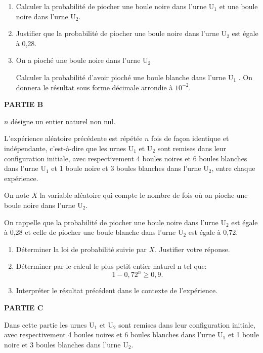 \documentclass[10pt]{article}
\begin{document}
\begin{enumerate}[start=2]
\item Calculer la probabilité de piocher une boule noire dans l'urne U$_1$ et une boule noire dans l'urne U$_2$.
\item Justifier que la probabilité de piocher une boule noire dans l'urne U$_2$ est égale à 0,28.
\item On a pioché une boule noire dans l'urne U$_2$

Calculer la probabilité d'avoir pioché une boule
blanche dans l'urne U$_1$ . On donnera le résultat sous forme décimale arrondie à $10^{-2}$.
\end{enumerate}

\medskip

\textbf{PARTIE B}

\medskip

$n$ désigne un entier naturel non nul.

L'expérience aléatoire précédente est répétée $n$ fois de façon identique et indépendante, c'est-à-dire que les urnes U$_1$ et U$_2$ sont remises dans leur configuration initiale, avec respectivement 4 boules noires et 6 boules blanches dans l'urne U$_1$ et 1 boule noire et 3 boules blanches dans l'urne U$_2$, entre chaque expérience.

On note $X$ la variable aléatoire qui compte le nombre de fois où on pioche une boule noire dans l'urne U$_2$.

On rappelle que la probabilité de piocher une boule noire dans l'urne U$_2$ est égale à 0,28 et celle de piocher une boule blanche dans l'urne U$_2$ est égale à 0,72.

\medskip

\begin{enumerate}
\item Déterminer la loi de probabilité suivie par $X$. Justifier votre réponse.
\item Déterminer par le calcul le plus petit entier naturel n tel que: 
\[1 - 0,72^n \geqslant 0,9.\]
\item Interpréter le résultat précédent dans le contexte de l'expérience.
\end{enumerate}

\medskip

\textbf{PARTIE C}

\medskip

Dans cette partie les urnes U$_1$ et U$_2$ sont remises dans leur configuration initiale, avec respectivement 4 boules noires et 6 boules blanches dans l'urne U$_1$ et 1 boule noire et 3 boules blanches dans l'urne U$_2$.
\end{document}
